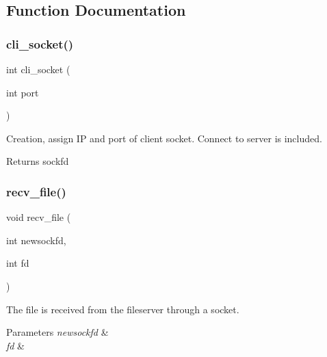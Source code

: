 \subsection{Function Documentation}
\mbox{\label{socket__client_8c_ad00c6fbc3ed7bc44f4e78ad434174830}} 
\subsubsection{cli\+\_\+socket()}
{\footnotesize\ttfamily int cli\+\_\+socket (\begin{DoxyParamCaption}\item[{int}]{port }\end{DoxyParamCaption})}



Creation, assign IP and port of client socket. Connect to server is included. 

\begin{DoxyReturn}{Returns}
sockfd 
\end{DoxyReturn}
\mbox{\label{socket__client_8c_adb6899099476fe2ee0d39ca1ac603c09}} 
\subsubsection{recv\+\_\+file()}
{\footnotesize\ttfamily void recv\+\_\+file (\begin{DoxyParamCaption}\item[{int}]{newsockfd,  }\item[{int}]{fd }\end{DoxyParamCaption})}



The file is received from the fileserver through a socket. 


\begin{DoxyParams}{Parameters}
{\em newsockfd} & \\
\hline
{\em fd} & \\
\hline
\end{DoxyParams}
\mbox{\label{socket__client_8c_a82f7baba357b9320dc3a1f61718f8b48}} 
